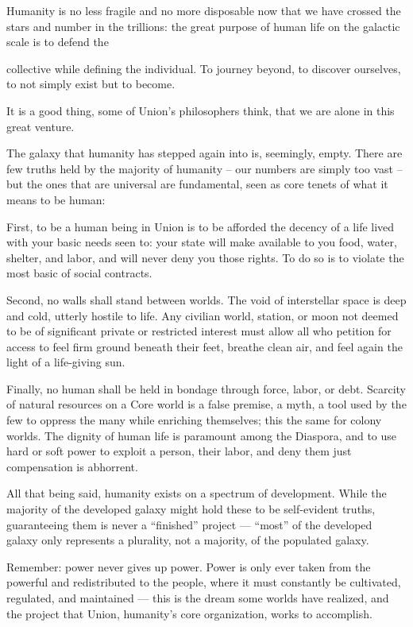 Humanity is no less fragile and no more disposable now that we have crossed the stars and  
number in the trillions: the great purpose of human life on the galactic scale is to defend the  

                                                                                                              


collective while defining the individual. To journey beyond, to discover ourselves, to not simply  
exist but to become. 
 

It is a good thing, some of Union’s philosophers think, that we are alone in this great venture. 
 

The galaxy that humanity has stepped again into is, seemingly, empty. There are few truths held  
by the majority of humanity -- our numbers are simply too vast -- but the ones that are universal  
are fundamental, seen as core tenets of what it means to be human: 
 

First, to be a human being in Union is to be afforded the decency of a life lived with your basic  
needs seen to: your state will make available to you food, water, shelter, and labor, and will never  
deny you those rights. To do so is to violate the most basic of social contracts. 
 

Second, no walls shall stand between worlds. The void of interstellar space is deep and cold,  
utterly hostile to life. Any civilian world, station, or moon not deemed to be of significant private  
or restricted interest must allow all who petition for access to feel firm ground beneath their feet,  
breathe clean air, and feel again the light of a life-giving sun. 
 

Finally, no human shall be held in bondage through force, labor, or debt. Scarcity of natural  
resources on a Core world is a false premise, a myth, a tool used by the few to oppress the many  
while enriching themselves; this the same for colony worlds. The dignity of human life is  
paramount among the Diaspora, and to use hard or soft power to exploit a person, their labor,  
and deny them just compensation is abhorrent.  
 

All that being said, humanity exists on a spectrum of development. While the majority of the  
developed galaxy might hold these to be self-evident truths, guaranteeing them is never a  
“finished” project — “most” of the developed galaxy only represents a plurality, not a majority, of  
the populated galaxy. 
 

Remember: power never gives up power. Power is only ever taken from the powerful and  
redistributed to the people, where it must constantly be cultivated, regulated, and maintained —  
this is the dream some worlds have realized, and the project that Union, humanity’s core  
organization, works to accomplish. 
 

